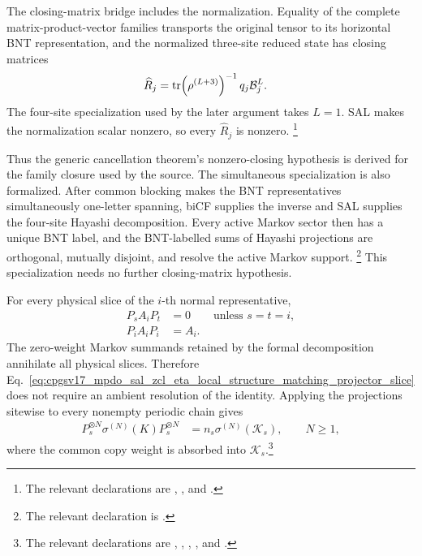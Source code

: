 \documentclass{article}
\begin{document}
The closing-matrix bridge includes the normalization. Equality of the complete
matrix-product-vector families transports the original tensor to its
horizontal BNT representation, and the normalized three-site reduced state
has closing matrices
\begin{align}
    \widehat R_j
        &=
        \operatorname{tr}\!\left(\rho^{(L+3)}\right)^{-1}
        q_j\mathcal B_j^L.
    \label{eq:cpgsv17_mpdo_sal_zcl_eta_local_structure_normalized_closing_matrix}
\end{align}
The four-site specialization used by the later argument takes $L=1$. SAL makes
the normalization scalar nonzero, so every $\widehat R_j$ is nonzero.
\footnote{The relevant declarations are
,
,
and
.}

Thus the generic cancellation theorem's nonzero-closing hypothesis is derived
for the family closure used by the source. The simultaneous specialization is
also formalized. After common blocking makes the BNT representatives
simultaneously one-letter spanning, biCF supplies the inverse and SAL supplies
the four-site Hayashi decomposition. Every active Markov sector then has a
unique BNT label, and the BNT-labelled sums of Hayashi projections are
orthogonal, mutually disjoint, and resolve the active Markov support.
\footnote{The relevant declaration is
.}
This specialization needs no further closing-matrix hypothesis.

For every physical slice of the $i$-th normal representative,
\begin{align}
    P_sA_iP_t
        &=0
        \qquad\text{unless }s=t=i,
    \label{eq:cpgsv17_mpdo_sal_zcl_eta_local_structure_projector_slice_vanishing}\\
    P_iA_iP_i
        &=A_i.
    \label{eq:cpgsv17_mpdo_sal_zcl_eta_local_structure_matching_projector_slice}
\end{align}
The zero-weight Markov summands retained by the formal decomposition annihilate
all physical slices. Therefore
Eq.~\ref{eq:cpgsv17_mpdo_sal_zcl_eta_local_structure_matching_projector_slice}
does not require an ambient resolution of the identity. Applying the
projections sitewise to every nonempty periodic chain gives
\begin{align}
    P_s^{\otimes N}
    \sigma^{(N)}(K)
    P_s^{\otimes N}
        &=
        n_s\sigma^{(N)}(\mathcal K_s),
        \qquad N\geq 1,
    \label{eq:cpgsv17_mpdo_sal_zcl_eta_local_structure_sitewise_sector_compression}
\end{align}
where the common copy weight is absorbed into $\mathcal K_s$.\footnote{The
relevant declarations are
,
,
,
, and
.}
\end{document}

